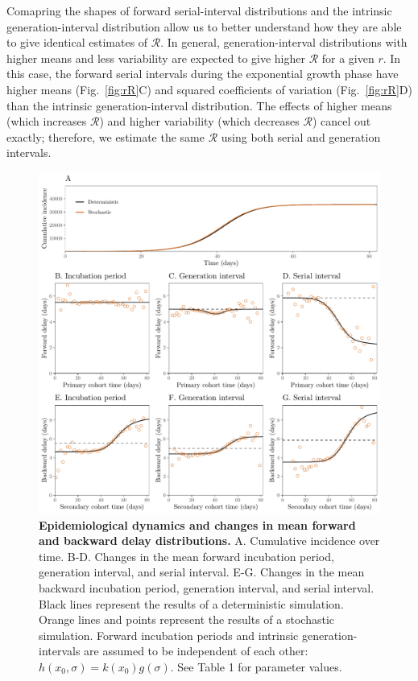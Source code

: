 \documentclass[12pt]{article}
\newcommand{\fref}[1]{Fig.~\ref{fig:#1}}
\begin{document}
Comapring the shapes of forward serial-interval distributions and the intrinsic generation-interval distribution allow us to better understand how they are able to give identical estimates of $\mathcal R$.
In general, generation-interval distributions with higher means and less variability are expected to give higher $\mathcal R$ for a given $r$.
In this case, the forward serial intervals during the exponential growth phase have higher means (\fref{rR}C) and squared coefficients of variation (\fref{rR}D) than the intrinsic generation-interval distribution.
The effects of higher means (which increases $\mathcal R$) and higher variability (which decreases $\mathcal R$) cancel out exactly;
therefore, we estimate the same $\mathcal R$ using both serial and generation intervals.

\begin{figure}[!th]
\includegraphics[width=\textwidth]{forward.pdf}
\caption{
\textbf{Epidemiological dynamics and changes in mean forward and backward delay distributions.}
A. Cumulative incidence over time.
B-D. Changes in the mean forward incubation period, generation interval, and serial interval.
E-G. Changes in the mean backward incubation period, generation interval, and serial interval.
Black lines represent the results of a deterministic simulation.
Orange lines and points represent the results of a stochastic simulation.
Forward incubation periods and intrinsic generation-intervals are assumed to be independent of each other: $h(x_0, \sigma) = k(x_0) g(\sigma)$.
See Table 1 for parameter values.
}
\label{fig:epi}
\end{figure}
\end{document}
